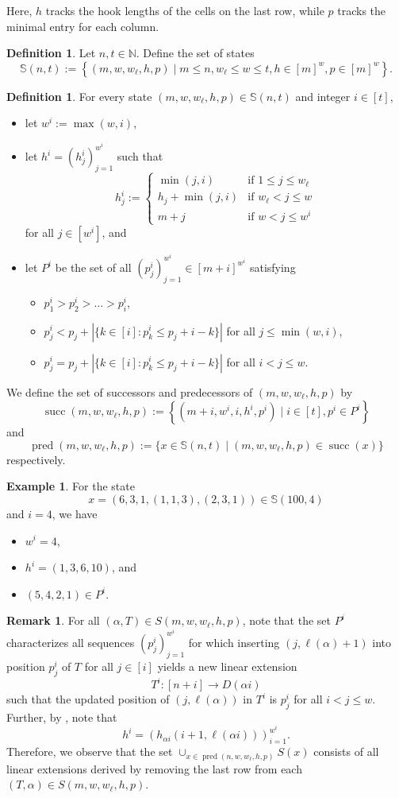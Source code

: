 \documentclass[12pt]{amsart}
\DeclareMathOperator{\successor}{succ}
\DeclareMathOperator{\pred}{pred}
\theoremstyle{definition}
\newtheorem{example}[theorem]{Example}
\newtheorem{definition}[theorem]{Definition}
\newtheorem{remark}[theorem]{Remark}
\begin{document}
Here, $h$ tracks the hook lengths of the cells on the last row, while $p$ tracks the minimal entry for each column.
\begin{definition}
Let $n,t\in \mathbb{N}$. Define the set of states
\[\mathbb{S}(n,t):=\left\{(m,w,w_{\ell},h,p)\mid m\le n, w_{\ell}\le w\le t, h\in[m]^{w},p\in[m]^{w}\right\}.\]
\end{definition}
\begin{definition}
For every state $(m,w,w_{\ell},h,p)\in\mathbb{S}(n,t)$ and integer $i\in [t]$, 
\begin{itemize}
\item let $w^i:=\max(w,i)$,
\item let $h^{i}=(h_j^i)_{j=1}^{w^i}$ such that
\[h^i_j:=\begin{cases}\min(j,i) & \text{if } 1\le j\le w_{\ell}\\ h_{j}+\min(j,i)&\text{if } w_{\ell}<j\le w \\ m+j&\text{if } w<j\le w^i\end{cases}\]
for all $j\in[w^i]$, and
\item let $P^i$ be the set of all $(p_j^i)_{j=1}^{w^i}\in [m+i]^{w^i}$ satisfying \begin{itemize}\item $p_1^i > p_2^i>\dots>p_i^i$,\item $p_j^i<p_j+|\{k\in [i]: p_k^i\le p_j+i-k\}|$ for all $j\le \min(w,i)$, \item $p_j^i=p_j+|\{k\in [i]: p_k^i\le p_j+i-k\}|$ for all $i<j\le w$. \end{itemize}
\end{itemize}
We define the set of successors and predecessors of $(m,w,w_{\ell},h,p)$ by
\[\successor(m,w,w_{\ell},h,p) := \left\{(m+i,w^i,i,h^i,p^i)\mid i\in[t],p^i\in P^i\right\}\]
and
\[\pred(m,w,w_{\ell},h,p) := \{x\in \mathbb{S}(n,t)\mid (m,w,w_{\ell},h,p)\in \successor(x)\}\]
respectively.
\end{definition}
\begin{example}
For the state \[x=(6,3,1,(1,1,3),(2,3,1))\in \mathbb{S}(100,4)\] and $i=4$, we have 
\begin{itemize}
\item $w^i=4$, 
\item $h^i=(1,3,6,10)$, and 
\item $(5,4,2,1)\in P^i$.
\end{itemize}
\end{example}
\begin{remark}
For all $(\alpha,T)\in S(m,w,w_{\ell},h,p)$, note that the set $P^i$ characterizes all sequences $(p_{j}^i)_{j=1}^{w^i}$ for which inserting $(j,\ell(\alpha)+1)$ into position $p_j^i$ of $T$ for all $j\in [i]$ yields a new linear extension \[T^i:[n+i]\to D(\alpha i)\]
such that the updated position of $(j,\ell(\alpha))$ in $T^i$ is $p_j^i$ for all $i< j\le w$. Further, by , note that \[h^i=(h_{\alpha i}(i+1,\ell(\alpha i)))_{i=1}^{w^i}.\]
Therefore, we observe that the set $\cup_{x\in \pred(n,w,w_{\ell},h,p)} S(x)$ consists of all linear extensions derived by removing the last row from each $(T,\alpha)\in S(m,w,w_{\ell},h,p)$.
\end{remark}
\end{document}
